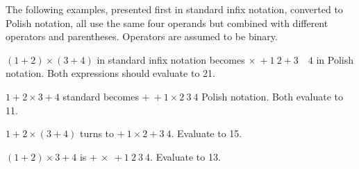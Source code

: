 \documentclass[12pt]{article}
\begin{document}
The following examples, presented first in standard infix notation, converted to Polish notation, all use the same four operands but combined with different operators and parentheses. Operators are assumed to be binary.

$(1 + 2) \times (3 + 4)$ in standard infix notation becomes $\times \: + 1 \: 2 + 3 \quad 4$ in Polish notation. Both expressions should evaluate to 21.

$1 + 2 \times 3 + 4$ standard becomes $+ \: + 1 \times 2 \: 3 \: 4$ Polish notation. Both evaluate to 11.

$1 + 2 \times (3 + 4)$ turns to $+ \: 1 \times 2 + 3 \: 4$. Evaluate to 15.

$(1 + 2) \times 3 + 4$ is $+ \: \times \: + 1 \: 2 \: 3 \: 4$. Evaluate to 13.
\end{document}
